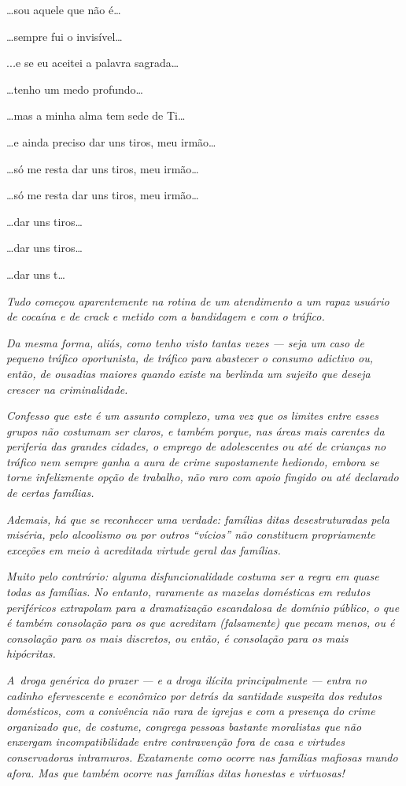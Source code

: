 …sou aquele que não é…

…sempre fui o invisível…

..\emph{.}e se eu aceitei a palavra sagrada…

…tenho um medo profundo…

…mas a minha alma tem sede de Ti…

…e ainda preciso dar uns tiros, meu irmão…

…só me resta dar uns tiros, meu irmão…

…só me resta dar uns tiros, meu irmão…

…dar uns tiros…

…dar uns tiros…

…dar uns
t…

\begin{center}\asterisc{}\end{center}
\begingroup\small

\emph{Tudo começou aparentemente na rotina de um atendimento a um rapaz
usuário de cocaína e de crack e metido com a bandidagem e com o
tráfico.}~

\emph{Da mesma forma, aliás, como tenho visto tantas vezes --- seja um
caso de pequeno tráfico oportunista, de tráfico para abastecer o consumo
adictivo ou, então, de ousadias maiores quando existe na berlinda um
sujeito que deseja crescer na criminalidade.}~

\emph{Confesso que este é um assunto complexo, uma vez que os limites
entre esses grupos não costumam ser claros, e também porque, nas áreas
mais carentes da periferia das grandes cidades, o emprego de
adolescentes ou até de crianças no tráfico nem sempre ganha a aura de
crime supostamente hediondo, embora se torne infelizmente opção de
trabalho, não raro com apoio fingido ou até declarado de certas
famílias.}~

\emph{Ademais, há que se reconhecer uma verdade: famílias ditas
desestruturadas pela miséria, pelo alcoolismo ou por outros ``vícios''
não constituem propriamente exceções em meio à acreditada virtude geral
das famílias.}~

\emph{Muito pelo contrário: alguma disfuncionalidade costuma ser a regra
em quase todas as famílias. No entanto, raramente as mazelas domésticas
em redutos periféricos extrapolam para a dramatização escandalosa de
domínio público, o que é também consolação para os que acreditam
(falsamente) que pecam menos, ou é consolação para os mais discretos, ou
então, é consolação para os mais hipócritas.}~

\emph{A~droga genérica do prazer --- e a droga ilícita principalmente
--- entra no cadinho efervescente e econômico por detrás da santidade
suspeita dos redutos domésticos, com a conivência não rara de igrejas e
com a presença do crime organizado que, de costume, congrega pessoas
bastante moralistas que não enxergam incompatibilidade entre
contravenção fora de casa e virtudes conservadoras intramuros.
Exatamente como ocorre nas famílias mafiosas mundo afora. Mas que também
ocorre nas famílias ditas honestas e virtuosas!}

